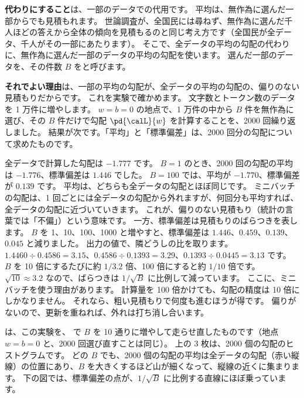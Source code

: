 \textbf{代わりにすること}は、一部のデータでの代用です。
平均は、無作為に選んだ一部からでも見積もれます。
世論調査が、全国民には尋ねず、無作為に選んだ千人ほどの答えから全体の傾向を見積もるのと同じ考え方です（全国民が全データ、千人がその一部にあたります）。
そこで、全データの平均の勾配の代わりに、無作為に選んだ一部のデータの平均の勾配を使います。
選んだ一部のデータを、その件数 $B$ をと呼びます。

\textbf{それでよい理由}は、一部の平均の勾配が、全データの平均の勾配の、偏りのない見積もりだからです。
これを実験で確かめます。
文字数とトークン数のデータを 1 万件に増やします。
$w=b=0$ の地点で、1 万件の中から $B$ 件を無作為に選び、その $B$ 件だけで勾配 $\pd{\calL}{w}$ を計算することを、2000 回繰り返しました。
結果が次です。「平均」と「標準偏差」は、2000 回分の勾配について求めたものです。


全データで計算した勾配は $-1.777$ です。
$B=1$ のとき、2000 回の勾配の平均は $-1.776$、標準偏差は $1.446$ でした。
$B=100$ では、平均が $-1.770$、標準偏差が $0.139$ です。
平均は、どちらも全データの勾配とほぼ同じです。
ミニバッチの勾配は、1 回ごとには全データの勾配から外れますが、何回分も平均すれば、全データの勾配に近づいていきます。
これが、偏りのない見積もり（統計の言葉では「不偏」）という意味です。
一方、標準偏差は見積もりのばらつきを表します。
$B$ を 1、10、100、1000 と増やすと、標準偏差は $1.446$、$0.459$、$0.139$、$0.045$ と減りました。
出力の値で、隣どうしの比を取ります。
$1.4460\div0.4586=3.15$、$0.4586\div0.1393=3.29$、$0.1393\div0.0445=3.13$ です。
$B$ を 10 倍にするたびに約 $1/3.2$ 倍、100 倍にすると約 $1/10$ 倍です。
$\sqrt{10}\approx 3.2$ なので、ばらつきは $1/\sqrt{B}$ に比例して減っています。
ここに、ミニバッチを使う理由があります。
計算量を 100 倍かけても、勾配の精度は 10 倍にしかなりません。
それなら、粗い見積もりで何度も進むほうが得です。
偏りがないので、更新を重ねれば、外れは打ち消し合います。

は、この実験を、 で $B$ を 10 通りに増やして走らせ直したものです（地点 $w=b=0$ と、2000 回選び直すことは同じ）。
上の 3 枚は、2000 個の勾配のヒストグラムです。
どの $B$ でも、2000 個の勾配の平均は全データの勾配（赤い縦線）の位置にあり、$B$ を大きくするほど山が細くなって、縦線の近くに集まります。
下の図では、標準偏差の点が、$1/\sqrt{B}$ に比例する直線にほぼ乗っています。

